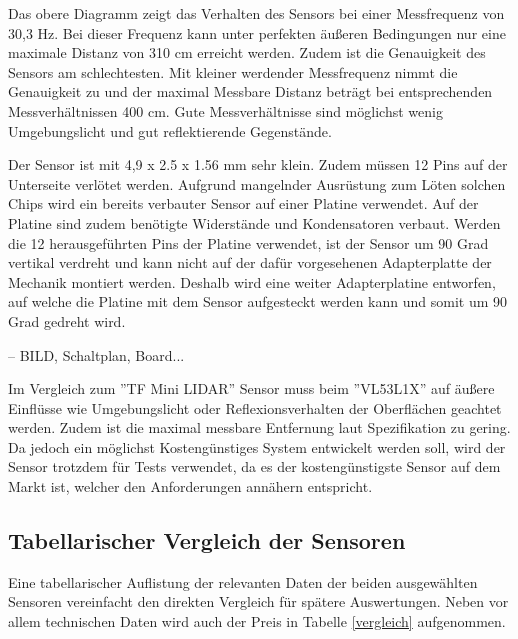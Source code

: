 Das obere Diagramm zeigt das Verhalten des Sensors bei einer Messfrequenz von 30,3 Hz. Bei dieser Frequenz kann unter perfekten äußeren Bedingungen nur eine maximale Distanz von 310 cm erreicht werden. Zudem ist die Genauigkeit des Sensors am schlechtesten. Mit kleiner werdender Messfrequenz nimmt die Genauigkeit zu und der maximal Messbare Distanz beträgt bei entsprechenden Messverhältnissen 400 cm. Gute Messverhältnisse sind möglichst wenig Umgebungslicht und gut reflektierende Gegenstände. \cite{VL53L1X_manual}


Der Sensor ist mit 4,9 x 2.5 x 1.56 mm sehr klein. Zudem müssen 12 Pins auf der Unterseite verlötet werden. Aufgrund mangelnder Ausrüstung zum Löten solchen Chips wird ein bereits verbauter Sensor auf einer Platine verwendet. Auf der Platine sind zudem benötigte Widerstände und Kondensatoren verbaut. Werden die 12 herausgeführten Pins der Platine verwendet, ist der Sensor um 90 Grad vertikal verdreht und kann nicht auf der dafür vorgesehenen Adapterplatte der Mechanik montiert werden. Deshalb wird eine weiter Adapterplatine entworfen, auf welche die Platine mit dem Sensor aufgesteckt werden kann und somit um 90 Grad gedreht wird.



-- BILD, Schaltplan, Board...


Im Vergleich zum ''TF Mini LIDAR'' Sensor muss beim ''VL53L1X'' auf äußere Einflüsse wie Umgebungslicht oder Reflexionsverhalten der Oberflächen geachtet werden. Zudem ist die maximal messbare Entfernung laut Spezifikation zu gering. Da jedoch ein möglichst Kostengünstiges System entwickelt werden soll, wird der Sensor trotzdem für Tests verwendet, da es der kostengünstigste Sensor auf dem Markt ist, welcher den Anforderungen annähern entspricht.



\subsection{Tabellarischer Vergleich der Sensoren}

Eine tabellarischer Auflistung der relevanten Daten der beiden ausgewählten Sensoren vereinfacht den direkten Vergleich für spätere Auswertungen. Neben vor allem technischen Daten wird auch der Preis in Tabelle \ref{vergleich} aufgenommen.

